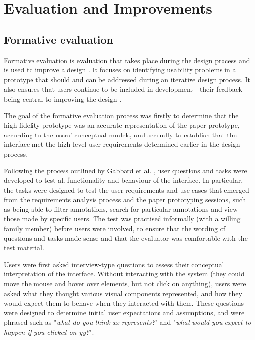 
\chapter{Evaluation and Improvements} %

\label{Evaluation and Improvements} %




\section{Formative evaluation}
Formative evaluation is evaluation that takes place during the design process and is used to improve a design \citep[p. 149]{Hartson}. It focuses on identifying usability problems in a prototype that should and can be addressed during an iterative design process. It also ensures that users continue to be included in development - their feedback being central to improving the design \citep{GabbardHix}. 

The goal of the formative evaluation process was firstly to determine that the high-fidelity prototype was an accurate representation of the paper prototype, according to the users' conceptual models, and secondly to establish that the interface met the high-level user requirements determined earlier in the design process.

Following the process outlined by Gabbard et al.  \citep{GabbardHix}, user questions and tasks were developed to test all functionality and behaviour of the interface. In particular, the tasks were designed to test the user requirements and use cases that emerged from the requirements analysis process and the paper prototyping sessions, such as being able to filter annotations, search for particular annotations and view those made by specific users. The test was practised informally (with a willing family member) before users were involved, to ensure that the wording of questions and tasks made sense and that the evaluator was comfortable with the test material.

Users were first asked interview-type questions to assess their conceptual interpretation of the interface. Without interacting with the system (they could move the mouse and hover over elements, but not click on anything), users were asked what they thought various visual components represented, and how they would expect them to behave when they interacted with them. These questions were designed to determine initial user expectations and assumptions, and were phrased such as "\textit{what do you think xx represents?}" and "\textit{what would you expect to happen if you clicked on yy?}". 

